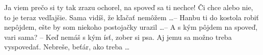Ja viem prečo si ty tak zrazu ochorel, na spoveď sa ti nechce! Či chce alebo nie,
to je teraz vedľajšie. Sama vidíš, že kľačať nemôžem \dots -- Hanbu ti do kostola
robiť nepôjdem, ešte by som niekoho postojačky urazil \dots -- A s kým pôjdem na
spoveď, vari sama? -- Keď nemáš s kým ísť, zober si psa. Aj jemu sa možno treba
vyspovedať. Nebreše, beťár, ako treba \dots
